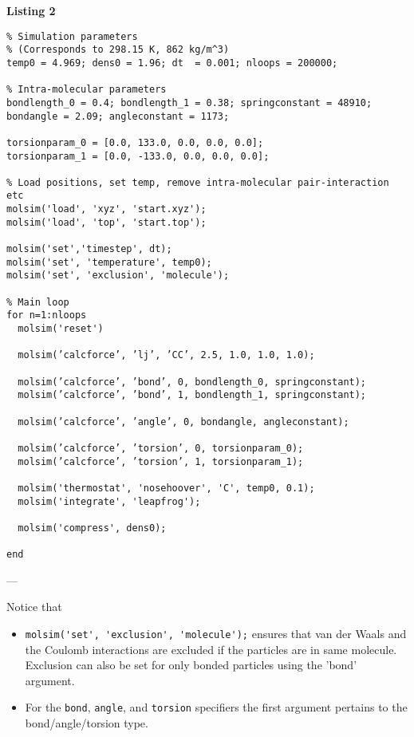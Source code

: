 \documentclass[11pt]{article}
\begin{document}
\noindent \textbf{Listing 2}
\begin{verbatim}
% Simulation parameters 
% (Corresponds to 298.15 K, 862 kg/m^3)
temp0 = 4.969; dens0 = 1.96; dt  = 0.001; nloops = 200000;

% Intra-molecular parameters
bondlength_0 = 0.4; bondlength_1 = 0.38; springconstant = 48910;
bondangle = 2.09; angleconstant = 1173;

torsionparam_0 = [0.0, 133.0, 0.0, 0.0, 0.0]; 
torsionparam_1 = [0.0, -133.0, 0.0, 0.0, 0.0];

% Load positions, set temp, remove intra-molecular pair-interaction etc
molsim('load', 'xyz', 'start.xyz');
molsim('load', 'top', 'start.top');

molsim('set','timestep', dt);
molsim('set', 'temperature', temp0);
molsim('set', 'exclusion', 'molecule');

% Main loop
for n=1:nloops
  molsim('reset')

  molsim(’calcforce’, ’lj’, ’CC’, 2.5, 1.0, 1.0, 1.0);
  
  molsim(’calcforce’, ’bond’, 0, bondlength_0, springconstant);
  molsim(’calcforce’, ’bond’, 1, bondlength_1, springconstant);
  
  molsim(’calcforce’, ’angle’, 0, bondangle, angleconstant);

  molsim(’calcforce’, ’torsion’, 0, torsionparam_0);
  molsim(’calcforce’, ’torsion’, 1, torsionparam_1);
  
  molsim('thermostat', 'nosehoover', 'C', temp0, 0.1);
  molsim('integrate', 'leapfrog');

  molsim('compress', dens0);

end
\end{verbatim}

\noindent ---

\noindent Notice that
\begin{itemize}
\item \verb!molsim('set', 'exclusion', 'molecule');! ensures that van
  der Waals and the Coulomb interactions are excluded if the particles
  are in same molecule. Exclusion can also be set for only bonded particles
  using the 'bond' argument.
\item For the \verb!bond!, \verb!angle!, and \verb!torsion! specifiers the first
  argument pertains to the bond/angle/torsion type.  
\end{itemize}
\end{document}
